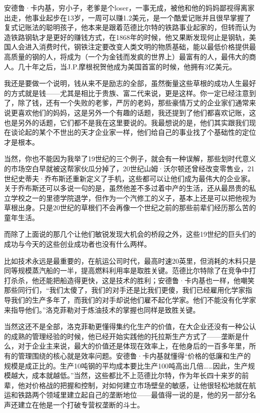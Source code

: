 安德鲁·卡内基，穷小子，老爹是个loser，一事无成，被他和他的妈妈鄙视得离家出走，他事业起步在13岁，一周可以赚1.2美元，是一个酷爱记账并且很早掌握了复式记账法的聪明孩子，他本来是跟着范德比尔特的铁路事业起家的，但转而认为造铁路钢轨才是更好的赚钱方式，在1868年的时候，他又果断发现何止是钢轨，美国人会进入消费时代，钢铁注定要改变人类文明的物质基础，能以最低价格提供最高质量的钢的人，将成为（一个为金钱而发疯的世界上）最富有的人，最伟大的商人。几十年之后，当J.P.摩根祝贺他成为美国首富的时候，他拥有3亿美元。

我还是要做一个说明，钱从来不是励志的全部，虽然衡量这些草根的成功人生最好的方式就是钱------尤其是相比于贵族、富二代来说，更是这样。你一定已经注意到了，除了钱，还有一个失败的老爹，严厉的老妈，那些豪情万丈的企业家们通常来说更喜欢他们的妈妈，这是另外一个有趣的话题，我还提到了他们都喜欢记账，这也是另外的话题，它们都不是我在这里要说的。我最想说的是，他们其实跟我们现在谈论起的某个不世出的天才企业家一样，他们给自己的事业找了个基础性的定位才是根本。

当然，你也不能因为我举了19世纪的三个例子，就会有一种误解，那些划时代意义的市场空白早就被这帮家伙瓜分掉了，20世纪山姆·沃尔顿还曾经改变零售业，21世纪史蒂夫·乔布斯还重新定义了手机，这些都可以让他们成为最伟大的企业家。关于乔布斯还可以多说一句的是，虽然他差不多过着中产的生活，还从最昂贵的私立学校之一的里德学院退学，但作为一个汽修工的义子，基本上还是可以把他视为草根出身。只是20世纪的草根们不会再像一个世纪之前的那些前辈们经历那么苦的童年生活。

而除了上面说的那几个让他们敏锐发现大机会的桥段之外，这些19世纪的巨头们的成功与今天的这些创业成功者也没有什么两样。

比如技术永远是最重要的，在航运公司时代，最高时速20英里，但消耗的木料只是同等规模蒸汽船的一半，提高燃料利用率是取胜关键。范德比尔特除了在竞争中打打杀杀，他还能把船造得更快，这是技术的胜利；安德鲁·卡内基也一样，他嘲笑那些同行们，``我们太傻了，我们的对手还是比我们更傻，我们已经雇用化学家指导我们的生产多年了，而我们的对手却说他们雇不起化学家。他们不能没有化学家来指导他们。''洛克菲勒对于炼油技术的掌握也同样是致胜关键。

当然这还不是全部，洛克菲勒更懂得集约化生产的价值，在大企业还没有一种公认的成熟的管理经验的时候，他已经开始实践他的托拉斯生产方式了------垄断是什么，对于企业主来说，最大的价值还是体现在效率上，在他身后的一百多年里，所有的管理围绕的核心就是效率问题。安德鲁·卡内基就懂得``价格的低廉和生产的规模是成正比的。生产10吨钢的平均成本要比生产100吨高出几倍\ldots{}\ldots{}因此，生产规模越大，成本就越低。''当然，这些都比不上范德比尔特，作为年长四十来岁的前辈，他对价格战的把握和控制，对如何建立市场壁垒的敏感，让他很轻松地就在航运和铁路两个领域里建立起自己的垄断地位------最值得一说的是，他的另一部分名声还建立在他是一个打破专营权垄断的斗士。


